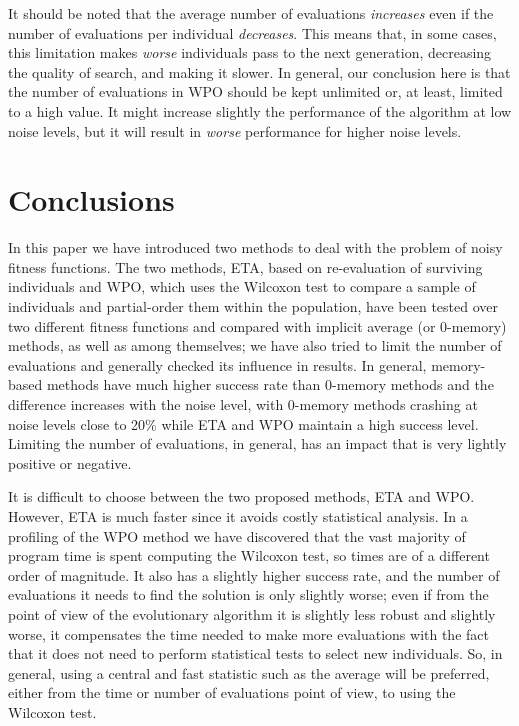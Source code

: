 \documentclass{svmult}
\begin{document}
It should be noted that the average number of evaluations {\em
  increases} even if the number of evaluations per individual {\em
  decreases}. This means that, in some cases, this limitation makes
{\em worse} individuals pass to the next generation, decreasing the
quality of search, 
and making it slower. In general, our conclusion
here is that the number of evaluations in WPO should be kept unlimited
or, at least, limited to a high value. It might increase slightly the
performance of the algorithm at low noise levels, but it will result
in {\em worse} performance for higher noise levels. 


\section{Conclusions}

In this paper we have introduced two methods to deal with the problem
of noisy fitness functions. The two methods, {\sf ETA}, based on
re-evaluation of surviving individuals and {\sf WPO}, which uses the
Wilcoxon test to compare a sample of individuals and partial-order
them within the population, 
 have been tested over two
different fitness functions and compared with implicit average (or
0-memory) methods, as well as among themselves; we have also tried to
limit the number of evaluations and generally checked its influence in
results. In general,
memory-based methods have much higher success rate than 0-memory
methods and the difference increases with the noise level, with
0-memory methods crashing at noise levels close to 20\% while ETA and
WPO maintain a high success level. Limiting the number of evaluations,
in general, has an impact that is very lightly positive or
negative. 

It is difficult to choose between the two proposed methods, ETA and
WPO. However, ETA is much faster since it avoids costly
statistical analysis. In a profiling of the WPO method we have
discovered that the vast majority of program time is spent computing
the Wilcoxon test, so times are of a different order of magnitude. 
It also has a slightly higher success rate, and the
number of evaluations it needs to find the solution is only slightly
worse; even if from the point of view of the evolutionary algorithm it
is slightly less robust and slightly worse, it compensates the time
needed to make more evaluations with the fact that it does not need to
perform statistical tests to select new individuals. So, in general,
using a central and fast statistic such as the average will be
preferred, either from the time or number of evaluations point of
view, to using the Wilcoxon test. 
\end{document}
